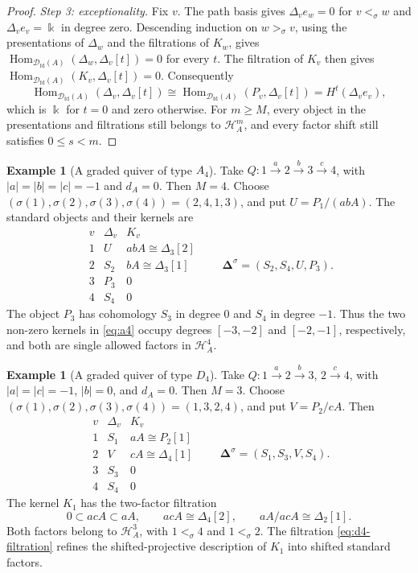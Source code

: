 \documentclass[11pt,a4paper]{article}
\newcommand{\D}{\mathcal D}
\renewcommand{\H}{\mathcal H}
\newcommand{\std}{\Delta}
\DeclareMathOperator{\fd}{fd}
\DeclareMathOperator{\Hom}{Hom}
\theoremstyle{plain}
\theoremstyle{definition}
\newtheorem{example}[theorem]{Example}
\numberwithin{equation}{section}
\begin{document}
\begin{proof}
\noindent\textit{Step 3: exceptionality.}
Fix $v$. The path basis gives $\std_ve_w=0$ for $v<_\sigma w$ and
$\std_ve_v=\Bbbk$ in degree zero. Descending induction on
$w>_\sigma v$, using the presentations of $\std_w$ and the
filtrations of $K_w$, gives
$\Hom_{\D_{\fd}(A)}(\std_w,\std_v[t])=0$ for every $t$.
The filtration of $K_v$ then gives
$\Hom_{\D_{\fd}(A)}(K_v,\std_v[t])=0$. Consequently
\[
 \Hom_{\D_{\fd}(A)}(\std_v,\std_v[t])
 \cong\Hom_{\D_{\fd}(A)}(P_v,\std_v[t])
 =H^t(\std_ve_v),
\]
which is $\Bbbk$ for $t=0$ and zero otherwise.
For $m\geq M$, every object in the presentations and filtrations still
belongs to $\H_A^m$, and every factor shift still satisfies $0\leq s<m$.
\end{proof}

\begin{example}[A graded quiver of type $A_4$]\label{ex:a4}
Take $Q:1\xrightarrow{a}2\xrightarrow{b}3\xrightarrow{c}4$, with
$|a|=|b|=|c|=-1$ and $d_A=0$. Then $M=4$.
Choose $(\sigma(1),\sigma(2),\sigma(3),\sigma(4))=(2,4,1,3)$,
and put $U=P_1/(abA)$. The standard objects and their kernels are
\begin{equation}\label{eq:a4}
 \begin{array}{c|c|c}
 v&\std_v&K_v\\\hline
 1&U&abA\cong\std_3[2]\\
 2&S_2&bA\cong\std_3[1]\\
 3&P_3&0\\
 4&S_4&0
 \end{array}
 \qquad
 \boldsymbol\std^\sigma=(S_2,S_4,U,P_3).
\end{equation}
The object $P_3$ has cohomology $S_3$ in degree $0$ and $S_4$ in
degree $-1$. Thus the two non-zero kernels in \eqref{eq:a4} occupy
degrees $[-3,-2]$ and $[-2,-1]$, respectively, and both are single
allowed factors in $\H_A^4$.
\end{example}

\begin{example}[A graded quiver of type $D_4$]\label{ex:d4}
Take $Q:1\xrightarrow{a}2\xrightarrow{b}3$, $2\xrightarrow{c}4$,
with $|a|=|c|=-1$, $|b|=0$, and $d_A=0$. Then $M=3$.
Choose $(\sigma(1),\sigma(2),\sigma(3),\sigma(4))=(1,3,2,4)$,
and put $V=P_2/cA$. Then
\begin{equation}\label{eq:d4}
 \begin{array}{c|c|c}
 v&\std_v&K_v\\\hline
 1&S_1&aA\cong P_2[1]\\
 2&V&cA\cong\std_4[1]\\
 3&S_3&0\\
 4&S_4&0
 \end{array}
 \qquad
 \boldsymbol\std^\sigma=(S_1,S_3,V,S_4).
\end{equation}
The kernel $K_1$ has the two-factor filtration
\begin{equation}\label{eq:d4-filtration}
 0\subset acA\subset aA,\qquad
 acA\cong\std_4[2],\qquad aA/acA\cong\std_2[1].
\end{equation}
Both factors belong to $\H_A^3$, with $1<_\sigma4$ and
$1<_\sigma2$. The filtration \eqref{eq:d4-filtration} refines the
shifted-projective description of $K_1$ into shifted standard factors.
\end{example}
\end{document}
